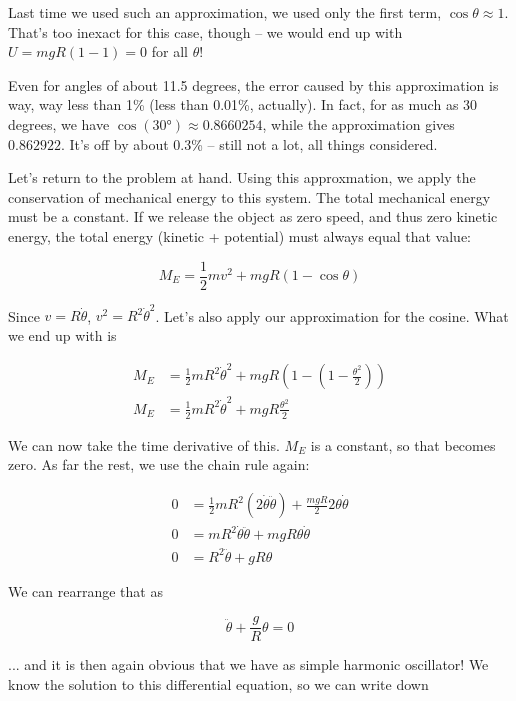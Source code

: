 \documentclass[12pt,a4paper]{report}
\begin{document}
Last time we used such an approximation, we used only the first term, $\cos \theta \approx 1$. That's too inexact for this case, though -- we would end up with $U = m g R (1 - 1) = 0$ for all $\theta$!

Even for angles of about 11.5 degrees, the error caused by this approximation is way, way less than 1\% (less than 0.01\%, actually). In fact, for as much as 30 degrees, we have $\cos(\ang{30}) \approx 0.8660254$, while the approximation gives $0.862922$. It's off by about 0.3\% -- still not a lot, all things considered.

Let's return to the problem at hand. Using this approxmation, we apply the conservation of mechanical energy to this system. The total mechanical energy must be a constant. If we release the object as zero speed, and thus zero kinetic energy, the total energy (kinetic + potential) must always equal that value:

\begin{equation}
M_E = \frac{1}{2} m v^2 + m g R(1 - \cos \theta)
\end{equation}

Since $v = R \dot{\theta}$, $v^2 = R^2 \dot{\theta}^2$. Let's also apply our approximation for the cosine. What we end up with is

\begin{align}
M_E &= \frac{1}{2} m R^2 \dot{\theta}^2 + m g R(1 - (1 - \frac{\theta^2}{2}))\\
M_E &= \frac{1}{2} m R^2 \dot{\theta}^2 + m g R \frac{\theta^2}{2}
\end{align}

We can now take the time derivative of this. $M_E$ is a constant, so that becomes zero. As far the rest, we use the chain rule again:

\begin{align}
0 &= \frac{1}{2} m R^2 (2 \dot{\theta} \ddot{\theta}) + \frac{m g R}{2} 2 \theta \dot{\theta}\\
0 &= m R^2 \dot{\theta} \ddot{\theta} + m g R \theta \dot{\theta}\\
0 &= R^2 \ddot{\theta} + g R \theta
\end{align}

We can rearrange that as

\begin{equation}
\ddot{\theta} + \frac{g}{R} \theta = 0
\end{equation}

... and it is then again obvious that we have as simple harmonic oscillator! We know the solution to this differential equation, so we can write down
\end{document}
